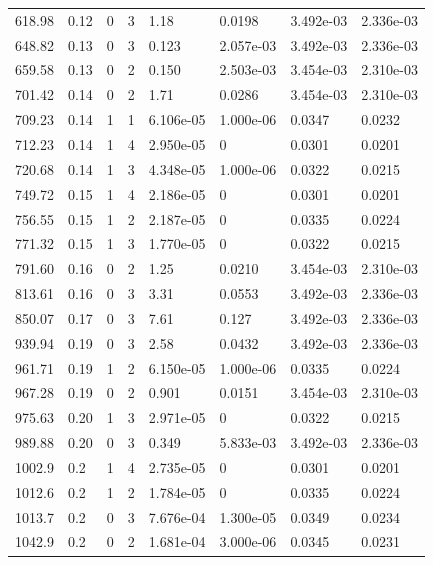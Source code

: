 \documentclass[preview]{standalone}
\begin{document}
{{{\begin{tabular}{L{1.2cm}C{1.2cm} C{0.3cm}C{0.5cm} C{1.4cm}C{1.4cm} C{1.4cm}C{1.4cm}}
  618.98  &  0.12  & 0     &  3 &  1.18  & 0.0198  & 3.492e-03 &  2.336e-03   \\ 
  648.82  &  0.13  & 0     &  3 &  0.123  & 2.057e-03  & 3.492e-03 &  2.336e-03   \\ 
  659.58  &  0.13  & 0     &  2 &  0.150  & 2.503e-03  & 3.454e-03 &  2.310e-03   \\ 
  701.42  &  0.14  & 0     &  2 &  1.71  & 0.0286  & 3.454e-03 &  2.310e-03   \\ 
  709.23  &  0.14  & 1     &  1 &  6.106e-05  & 1.000e-06  & 0.0347 &  0.0232   \\ 
  712.23  &  0.14  & 1     &  4 &  2.950e-05  & 0  & 0.0301 &  0.0201   \\ 
  720.68  &  0.14  & 1     &  3 &  4.348e-05  & 1.000e-06  & 0.0322 &  0.0215   \\ 
  749.72  &  0.15  & 1     &  4 &  2.186e-05  & 0  & 0.0301 &  0.0201   \\ 
  756.55  &  0.15  & 1     &  2 &  2.187e-05  & 0  & 0.0335 &  0.0224   \\ 
  771.32  &  0.15  & 1     &  3 &  1.770e-05  & 0  & 0.0322 &  0.0215   \\ 
  791.60  &  0.16  & 0     &  2 &  1.25  & 0.0210  & 3.454e-03 &  2.310e-03   \\ 
  813.61  &  0.16  & 0     &  3 &  3.31  & 0.0553  & 3.492e-03 &  2.336e-03   \\ 
  850.07  &  0.17  & 0     &  3 &  7.61  & 0.127  & 3.492e-03 &  2.336e-03   \\ 
  939.94  &  0.19  & 0     &  3 &  2.58  & 0.0432  & 3.492e-03 &  2.336e-03   \\ 
  961.71  &  0.19  & 1     &  2 &  6.150e-05  & 1.000e-06  & 0.0335 &  0.0224   \\ 
  967.28  &  0.19  & 0     &  2 &  0.901  & 0.0151  & 3.454e-03 &  2.310e-03   \\ 
  975.63  &  0.20  & 1     &  3 &  2.971e-05  & 0  & 0.0322 &  0.0215   \\ 
  989.88  &  0.20  & 0     &  3 &  0.349  & 5.833e-03  & 3.492e-03 &  2.336e-03   \\ 
  1002.9  &   0.2  & 1     &  4 &  2.735e-05  & 0  & 0.0301 &  0.0201   \\ 
  1012.6  &   0.2  & 1     &  2 &  1.784e-05  & 0  & 0.0335 &  0.0224   \\ 
  1013.7  &   0.2  & 0     &  3 &  7.676e-04  & 1.300e-05  & 0.0349 &  0.0234   \\ 
  1042.9  &   0.2  & 0     &  2 &  1.681e-04  & 3.000e-06  & 0.0345 &  0.0231   \\ 

\end{tabular}}}}
\end{document}
